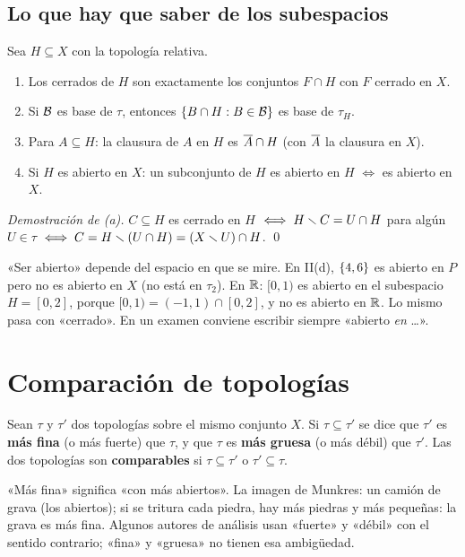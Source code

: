 \subsection{Lo que hay que saber de los subespacios}
\begin{teorema}[Propiedades]
Sea $H\subseteq X$ con la topología relativa.
\begin{enumerate}[label=(\alph*),leftmargin=1.9em]
\item Los cerrados de $H$ son exactamente los conjuntos $F\cap H$ con $F$ cerrado en $X$.
\item Si $\mathcal{B}$ es base de $\tau$, entonces $\{B\cap H:B\in\mathcal{B}\}$ es base de $\tau_H$.
\item Para $A\subseteq H$: la clausura de $A$ en $H$ es $\overline{A}\cap H$ (con $\overline{A}$ la clausura en $X$).
\item Si $H$ es abierto en $X$: un subconjunto de $H$ es abierto en $H$ $\iff$ es abierto en $X$.
\end{enumerate}
\end{teorema}
\emph{Demostración de (a).} $C\subseteq H$ es cerrado en $H$ $\iff H\smallsetminus C=U\cap H$ para algún $U\in\tau$
$\iff C=H\smallsetminus(U\cap H)=(X\smallsetminus U)\cap H$. \qed

\begin{ojo}
«Ser abierto» depende del espacio en que se mire. En II(d), $\{4,6\}$ es abierto en $P$ pero no es abierto en $X$
(no está en $\tau_2$). En $\mathbb{R}$: $[0,1)$ es abierto en el subespacio $H=[0,2]$, porque $[0,1)=(-1,1)\cap[0,2]$, y no
es abierto en $\mathbb{R}$. Lo mismo pasa con «cerrado». En un examen conviene escribir siempre «abierto \emph{en} \dots».
\end{ojo}

\section{Comparación de topologías}\label{sec:comp}
\begin{definicion}
Sean $\tau$ y $\tau'$ dos topologías sobre el mismo conjunto $X$. Si $\tau\subseteq\tau'$ se dice que $\tau'$ es
\textbf{más fina} (o más fuerte) que $\tau$, y que $\tau$ es \textbf{más gruesa} (o más débil) que $\tau'$. Las dos
topologías son \textbf{comparables} si $\tau\subseteq\tau'$ o $\tau'\subseteq\tau$.
\end{definicion}
«Más fina» significa «con más abiertos». La imagen de Munkres: un camión de grava (los abiertos); si se
tritura cada piedra, hay más piedras y más pequeñas: la grava es más fina. Algunos autores de análisis usan «fuerte» y
«débil» con el sentido contrario; «fina» y «gruesa» no tienen esa ambigüedad.

